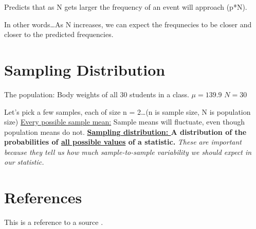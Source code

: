 \documentclass[11pt]{report}
\begin{document}
{
    Predicts that as N gets larger the frequency of an event will approach (p*N). \newline 

    In other words\dots As N increases, we can expect the frequnecies to be closer and closer to the predicted frequencies.
}

\section{Sampling Distribution}

{
    The population: \newline 
    Body weights of all 30 students in a class. \newline
    $\mu = 139.9$ \newline
    $N = 30$ \newline\newline

    Let's pick a few samples, each of size n = 2\dots (n is sample size, N is population size) \newline 
    \underline{Every possible sample mean:} Sample means will fluctuate, even though population means do not. \newline
    \textbf{\underline{Sampling distribution: } A distribution of the probabilities of \underline{all possible values} of a statistic.} \textit{These are important because they tell us how much sample-to-sample variability we should expect in our statistic.}
}

\section{References}
This is a reference to a source \cite{example}.



\end{document}
